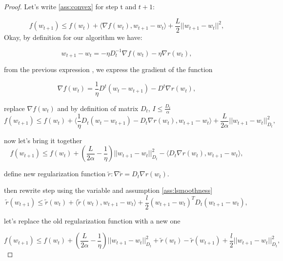 \documentclass{article}
\begin{document}
\begin{proof}

Let's write \ref{ass:convex} for step t and $t+1$:

\begin{equation*}
    f(w_{t+1}) \leq f(w_t) + \langle \nabla f(w_t), w_{t+1} - w_t \rangle + \frac{L}{2}||w_{t+1} - w_t ||^2,
\end{equation*}
Okay, by definition for our algorithm we have:

\begin{equation*}
w_{t+1} - w_t = -\eta D_t^{-1} \nabla f(w_t) - \eta \nabla r(w_t),
\end{equation*}

from the previous expression , we express the gradient of the function

\begin{equation*}
\nabla f(w_t) = \frac{1}{\eta} D^t(w_t - w_{t+1}) - D^t \nabla r(w_t),
\end{equation*}

replace $\nabla f(w_t)$ and by definition of matrix $D_t$, $I \leq \frac{D_t}{\alpha}$
\begin{equation*}
    f(w_{t+1}) \leq f(w_t) + \langle \frac{1}{\eta}D_t(w_t - w_{t+1}) - D_t\nabla r(w_t), w_{t+1} - w_t \rangle + \frac{L}{2 \alpha} ||w_{t+1} - w_t||_{D_t}^2,
\end{equation*}

now let's bring it together
\begin{equation*}
    f(w_{t+1}) \leq f(w_t) + \left(\frac{L}{2 \alpha} - \frac{1}{\eta} \right) ||w_{t+1} - w_t||_{D_t}^2 - \langle D_t \nabla r(w_t), w_{t+1} - w_t \rangle,
\end{equation*}

define new regularization function $\tilde{r} : \nabla \tilde{r} = D_t \nabla r(w_t)$. 

then rewrite step using the variable and assumption \ref{ass:lsmoothness}
\begin{equation*}
    \tilde{r}(w_{t+1}) \leq \tilde{r}(w_t) + \langle \tilde{r}(w_t), w_{t+1} - w_t \rangle + \frac{l}{2} (w_{t+1} - w_t)^T D_t (w_{t+1} - w_t),
\end{equation*}

let's replace the old regularization function with a new one

\begin{equation*}
    f(w_{t+1}) \leq f(w_t) + \left( \frac{L}{2\alpha} - \frac{1}{\eta} \right) ||w_{t+1} - w_t||_{D_t}^2 + \tilde{r}(w_t) - \tilde{r}(w_{t+1}) + \frac{l}{2}||w_{t+1}-w_t||_{D_t}^2,
\end{equation*}


\end{proof}
\end{document}
